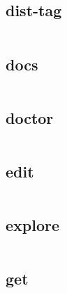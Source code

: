 \begin{lstlisting}[language=bash]

\end{lstlisting}

\subsection{dist-tag}


\begin{lstlisting}[language=bash]

\end{lstlisting}

\subsection{docs}



\begin{lstlisting}[language=bash]

\end{lstlisting}

\subsection{doctor}



\begin{lstlisting}[language=bash]

\end{lstlisting}

\subsection{edit}



\begin{lstlisting}[language=bash]

\end{lstlisting}

\subsection{explore}



\begin{lstlisting}[language=bash]

\end{lstlisting}

\subsection{get}



